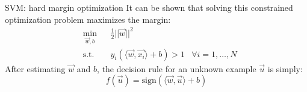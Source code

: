 \begin{frame}{SVM: hard margin optimization}
It can be shown that solving this constrained optimization problem maximizes the margin:
\begin{equation*}
\begin{aligned}
& \min_{\vec{w},b} & & \frac{1}{2}||\vec{w}||^2\\
& \text{s.t.} & &  y_i(\langle\vec{w},\vec{x_i}\rangle + b)>1 & \forall i=1,\ldots,N
\end{aligned}
\end{equation*}
After estimating $\vec{w}$ and $b$, the decision rule for an unknown example $\vec{u}$ is simply:
\begin{equation*}
f(\vec{u}) = \text{sign}(\langle\vec{w},\vec{u}\rangle + b)
\end{equation*}


\end{frame}